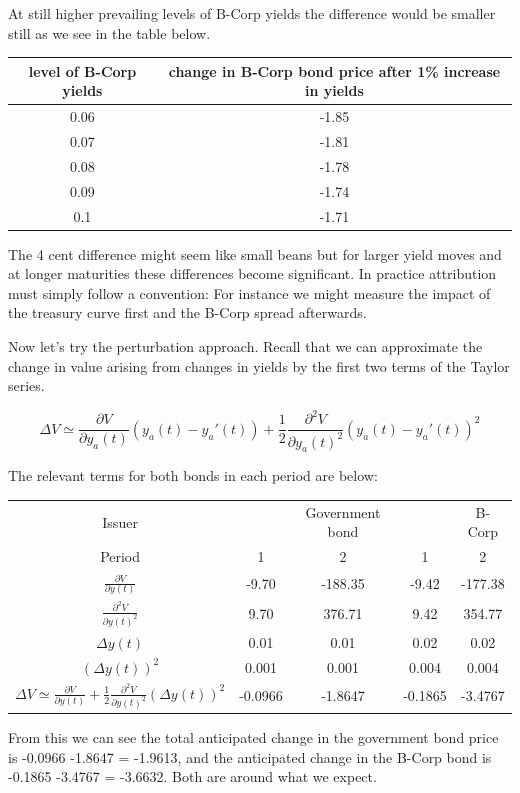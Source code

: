 At still higher prevailing levels of B-Corp yields the difference would be smaller still as we see in the table below.

\begin{tabular}{|c|c|}
\hline
level of B-Corp yields & change in B-Corp bond price after 1\% increase in yields\\
\hline
0.06 & -1.85\\
0.07 & -1.81\\
0.08 & -1.78\\
0.09 & -1.74\\
0.1 & -1.71\\
\hline
\end{tabular}


The 4 cent difference might seem like small beans but for larger yield moves and at longer maturities these differences become significant. In practice attribution must simply follow a convention: For instance we might measure the impact of the treasury curve first and the B-Corp spread afterwards.

Now let's try the perturbation approach. Recall that we can approximate the change in value arising from changes in yields by the first two terms of the Taylor series.

\[ \Delta V \simeq \frac{\partial V}{\partial y_a(t)}  (y_a(t)-y_a'(t)) + \frac{1}{2}\frac{\partial^2 V}{\partial y_a(t)^2} (y_a(t)-y_a'(t))^2  \]

The relevant terms for both bonds in each period are below:

\begin{tabular}{|c|cc|cc|}
\hline
 Issuer & &  Government bond & & B-Corp\\
 Period & 1 & 2 & 1 & 2\\
 \hline
 $\frac{\partial V}{\partial y(t)}$ & -9.70 & -188.35 & -9.42 & -177.38\\
 $\frac{\partial^2 V}{\partial y(t)^2}$& 9.70 & 376.71& 9.42 & 354.77\\
 $\Delta y(t)$ & 0.01 & 0.01 & 0.02 & 0.02\\
 $(\Delta y(t))^2$  & 0.001 & 0.001 & 0.004 & 0.004\\
 $\Delta V \simeq \frac{\partial V}{\partial y(t)} + \frac{1}{2} \frac{\partial^2 V}{\partial y(t)^2}(\Delta y(t))^2$ & -0.0966 & -1.8647 &  -0.1865 & -3.4767\\
 \hline
 \end{tabular}

From this we can see the total anticipated change in the government bond price is -0.0966 -1.8647 = -1.9613, and the anticipated change in the B-Corp bond is   -0.1865 -3.4767 = -3.6632. Both are around what we expect.

